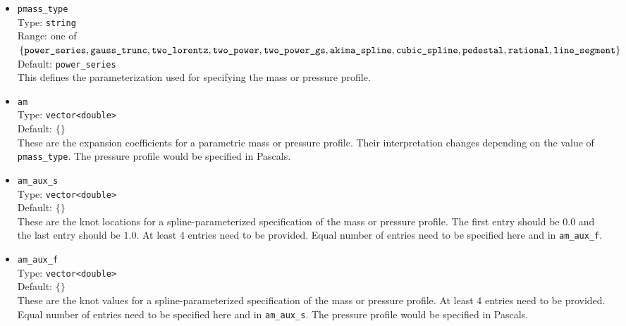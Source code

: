 \begin{itemize}

 \item \texttt{pmass\_type} \\
       Type: \texttt{string} \\
       Range: one of $\{ \texttt{power\_series},
                         \texttt{gauss\_trunc},
                         \texttt{two\_lorentz},
                         \texttt{two\_power},
                         \texttt{two\_power\_gs}, \\
                         \texttt{akima\_spline},
                         \texttt{cubic\_spline},
                         \texttt{pedestal},
                         \texttt{rational},
                         \texttt{line\_segment} \}$ \\
       Default: \texttt{power\_series} \\
       This defines the parameterization used for specifying the mass or pressure profile.

 \item \texttt{am} \\
       Type: \texttt{vector<double>} \\
       Default: $\{ \}$ \\
       These are the expansion coefficients for a parametric mass or pressure profile.
       Their interpretation changes depending on the value of \texttt{pmass\_type}.
       The pressure profile would be specified in Pascals.

 \item \texttt{am\_aux\_s} \\
       Type: \texttt{vector<double>} \\
       Default: $\{ \}$ \\
       These are the knot locations for a spline-parameterized specification
       of the mass or pressure profile.
       The first entry should be $0.0$ and the last entry should be $1.0$.
       At least 4 entries need to be provided.
       Equal number of entries need to be specified here and in \texttt{am\_aux\_f}.

 \item \texttt{am\_aux\_f} \\
       Type: \texttt{vector<double>} \\
       Default: $\{ \}$ \\
       These are the knot values for a spline-parameterized specification
       of the mass or pressure profile.
       At least 4 entries need to be provided.
       Equal number of entries need to be specified here and in \texttt{am\_aux\_s}.
       The pressure profile would be specified in Pascals.


\end{itemize}
